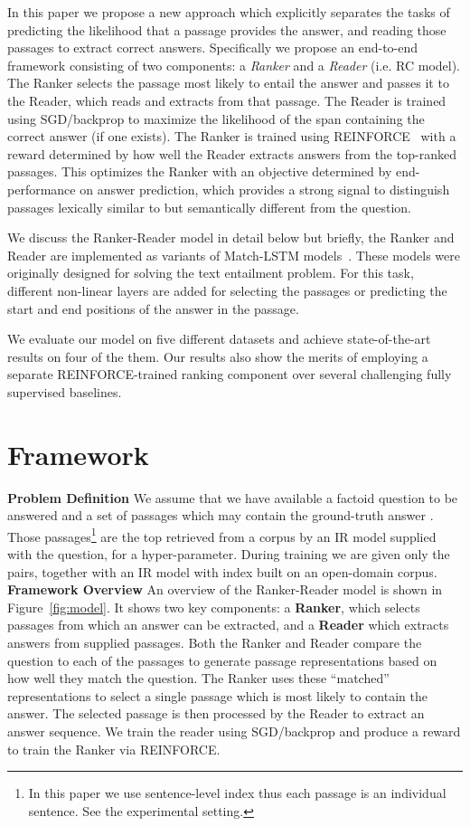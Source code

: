 \documentclass[letterpaper]{article} \usepackage{aaai18}  \usepackage{times}  \usepackage{helvet}  \usepackage{courier}  \usepackage{url}  \usepackage{graphicx}  \usepackage{comment}
\begin{document}
In this paper we propose a new approach 
which explicitly separates the tasks of predicting the likelihood that a passage 
provides 
the answer, and reading those passages to 
extract correct answers.  Specifically we propose an end-to-end framework consisting of two components: a \textit{Ranker} and a \textit{Reader} (i.e. RC model).  The Ranker selects the passage most likely to entail the answer and passes it to the Reader, which reads and extracts from that passage. The Reader is trained using SGD/backprop to maximize the likelihood of the span containing the correct answer (if one exists). The Ranker is trained using REINFORCE~\cite{Williams1992} with a reward determined by how well the Reader extracts answers from the top-ranked passages. This optimizes the Ranker with an objective determined by end-performance on answer prediction, which provides a strong signal to distinguish passages lexically similar to but semantically different from the question.

We discuss the Ranker-Reader model in detail below but briefly, the Ranker and Reader are implemented as variants of
Match-LSTM models~\cite{wang2015learning:NAACL2016}.  These models were originally designed for solving the text entailment problem. For this task, different non-linear layers are added for selecting the passages or predicting the start and end positions of the answer in the passage. 

We evaluate our model on five different datasets and achieve state-of-the-art results on four of the them.  Our results also show the merits of employing a separate REINFORCE-trained ranking component over several challenging fully supervised baselines.


\section{Framework}

\noindent\textbf{Problem Definition}\quad
We assume that we have available a factoid question  to be answered and a set of passages which may contain the ground-truth answer .  Those passages\footnote{In this paper we use sentence-level index thus each passage is an individual sentence. See the experimental setting.} are the top  retrieved from a corpus by an IR model supplied with the question, for  a hyper-parameter.
During training we are given only the  pairs, together with an IR model with index built on an open-domain corpus.\\


\noindent\textbf{Framework Overview} \quad
An overview of the Ranker-Reader model is shown in Figure~\ref{fig:model}. It shows two key components: a \textbf{Ranker}, which selects passages from which an answer can be extracted, and a \textbf{Reader} which extracts answers from supplied passages.  Both the Ranker and Reader compare the question to each of the passages to generate passage representations based on how well they match the question. The Ranker uses these ``matched'' representations to select a single passage which is most likely to contain the answer.  The selected passage is then processed by the Reader to extract an answer sequence.  We train the reader using SGD/backprop and produce a reward to train the Ranker via REINFORCE. 
\end{document}

